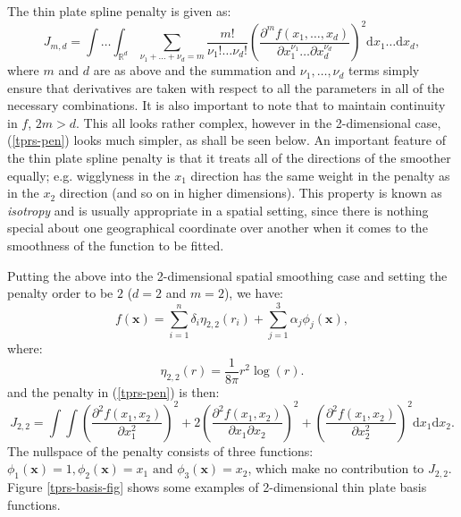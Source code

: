 The thin plate spline penalty is given as:
\begin{equation}
J_{m,d} = \int \ldots \int_{\mathbb{R}^d} \sum_{\nu_1 + \dots + \nu_d=m} \frac{m!}{\nu_1! \dots \nu_d!} \left ( \frac{\partial^m f(x_1,\dots,x_d)}{\partial x_1^{\nu_1} \ldots  \partial x_d^{\nu_d}} \right )^2 \text{d} x_1 \ldots  \text{d} x_d,
\label{tprs-pen}
\end{equation}
where $m$ and $d$ are as above and the summation and $\nu_1,\ldots,\nu_d$ terms simply ensure that derivatives are taken with respect to all the parameters in all of the necessary combinations. It is also important to note that to maintain continuity in $f$, $2m>d$. This all looks rather complex, however in the 2-dimensional case, (\ref{tprs-pen}) looks much simpler, as shall be seen below. An important feature of the thin plate spline penalty is that it treats all of the directions of the smoother equally; e.g. wigglyness in the $x_1$ direction has the same weight in the penalty as in the $x_2$ direction (and so on in higher dimensions). This property is known as \textit{isotropy} and is usually appropriate in a spatial setting, since there is nothing special about one geographical coordinate over another when it comes to the smoothness of the function to be fitted.

Putting the above into the 2-dimensional spatial smoothing case and setting the penalty order to be $2$ ($d=2$ and $m=2$), we have:
\begin{equation*}
f(\mathbf{x}) = \sum_{i=1}^n \delta_i \eta_{2,2}(r_i) + \sum_{j=1}^3 \alpha_j \phi_j(\mathbf{x}),
\end{equation*}
where:
\begin{equation*}
\eta_{2,2}(r) = \frac{1}{8\pi} r^2 \log(r).
\end{equation*}
and the penalty in (\ref{tprs-pen}) is then:
\begin{equation*}
J_{2,2} = \int \int \left ( \frac{\partial^2 f(x_1,x_2)}{\partial x_1^2} \right )^2 + 2\left ( \frac{\partial^2 f(x_1,x_2)}{\partial x_1  \partial x_2} \right )^2 + \left ( \frac{\partial^2 f(x_1,x_2)}{\partial x_2^2} \right )^2 \text{d} x_1 \text{d} x_2.
\end{equation*}
The nullspace of the penalty consists of three functions: $\phi_1(\mathbf{x})=1, \phi_2(\mathbf{x})=x_1 \text{ and } \phi_3(\mathbf{x})=x_2$, which make no contribution to $J_{2,2}$. Figure \ref{tprs-basis-fig} shows some examples of 2-dimensional thin plate basis functions.


